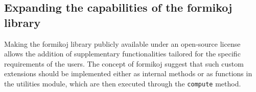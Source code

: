 \documentclass[a4paper,fleqn]{cas-sc}
\begin{document}

\subsection{Expanding the capabilities of the formikoj library}
Making the formikoj library publicly available under an open-source license 
allows the addition of supplementary functionalities tailored for the specific requirements of the users.
The concept of formikoj suggest that such custom extensions should be implemented either as internal methods or as functions in the utilities module, which are then executed through the \texttt{compute} method.%
\end{document}
